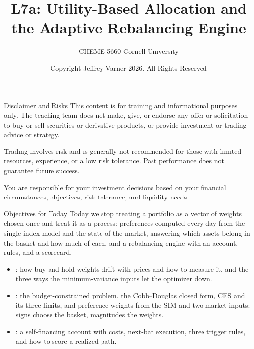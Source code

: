 \documentclass[aspectratio=169,11pt]{beamer}
\title{\texorpdfstring{{\vnheavy L7a}}{L7a}: Utility-Based Allocation and the Adaptive Rebalancing Engine}
\subtitle{CHEME 5660 Cornell University}
\author{Copyright Jeffrey Varner 2026. All Rights Reserved}
\begin{document}
\vntitlepage

\begin{frame}{Disclaimer and Risks}
  \vspace{0.6em}
  \textbf{} This content is for training and informational
  purposes only. The teaching team does not make, give, or endorse any offer or
  solicitation to buy or sell securities or derivative products, or provide
  investment or trading advice or strategy.

  \vspace{1.1em}
  \textbf{} Trading involves risk and is generally not recommended for
  those with limited resources, experience, or a low risk tolerance. Past
  performance does not guarantee future success.

  \vspace{1.1em}
  \textbf{} You are responsible for your investment decisions
  based on your financial circumstances, objectives, risk tolerance, and
  liquidity needs.
\end{frame}

\begin{frame}{Objectives for Today}
  Today we stop treating a portfolio as a vector of weights chosen once and treat
  it as a process: preferences computed every day from the single index model and
  the state of the market, answering which assets belong in the basket and how
  much of each, and a rebalancing engine with an account, rules, and a scorecard.

  \vspace{0.6em}
  {\large\textbf{}}
  \vspace{0.2em}
  \begin{itemize}\setlength{\itemsep}{0.45em}
    \item {}: how buy-and-hold weights drift
      with prices and how to measure it, and the three ways the minimum-variance
      inputs let the optimizer down.
    \item {}: the budget-constrained problem, the
      Cobb--Douglas closed form, CES and its three limits, and preference weights
      from the SIM and two market inputs: signs choose the basket, magnitudes the
      weights.
    \item {}: a self-financing account with costs,
      next-bar execution, three trigger rules, and how to score a realized path.
  \end{itemize}
\end{frame}
\end{document}
